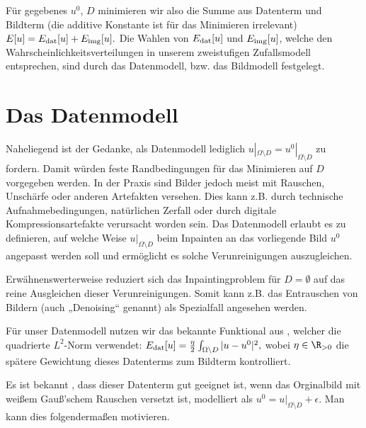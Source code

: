 \documentclass{mythesis}
\begin{document}
Für gegebenes $u^0$, $D$ minimieren wir also die Summe aus Datenterm und Bildterm (die additive Konstante ist für das Minimieren irrelevant)
\begin{math}
    E[u] = E_{\mathrm{dat}}[u] + E_{\mathrm{img}}[u].
\end{math}
Die Wahlen von $E_{\mathrm{dat}}[u]$ und $E_{\mathrm{img}}[u]$, welche den Wahrscheinlichkeitsverteilungen in unserem zweistufigen Zufallsmodell entsprechen, sind durch das Datenmodell, bzw. das Bildmodell festgelegt.


\section{Das Datenmodell}

Naheliegend ist der Gedanke, als Datenmodell lediglich $u|_{\Omega \setminus D} = u^0|_{\Omega \setminus D}$ zu fordern.
Damit würden feste Randbedingungen für das Minimieren auf $D$ vorgegeben werden.
In der Praxis sind Bilder jedoch meist mit Rauschen, Unschärfe oder anderen Artefakten versehen.
Dies kann z.B. durch technische Aufnahmebedingungen, natürlichen Zerfall oder durch digitale Kompressionsartefakte verursacht worden sein.
Das Datenmodell erlaubt es zu definieren, auf welche Weise $u|_{\Omega \setminus D}$ beim Inpainten an das vorliegende Bild $u^0$ angepasst werden soll und ermöglicht es solche Verunreinigungen auszugleichen.

Erwähnenswerterweise reduziert sich das Inpaintingproblem für $D = \emptyset$ auf das reine Ausgleichen dieser Verunreinigungen.
Somit kann z.B. das Entrauschen von Bildern (auch „Denoising“ genannt) als Spezialfall angesehen werden.

Für unser Datenmodell nutzen wir das bekannte Funktional aus \cite{rudin1992nonlinear}, welcher die quadrierte $L^2$-Norm verwendet:
\begin{math}
    E_{\mathrm{dat}}[u] = \frac{\eta}{2} \int_{\Omega \setminus D} |u - u^0|^2,
\end{math}
wobei $\eta \in \R_{> 0}$ die spätere Gewichtung dieses Datenterms zum Bildterm kontrolliert.

Es ist bekannt \cite[§4.5]{chan2005image}, dass dieser Datenterm gut geeignet ist, wenn das Orginalbild mit weißem Gauß'schem Rauschen versetzt ist, modelliert als $u^0 = u|_{\Omega \setminus D} + \epsilon$.
Man kann dies folgendermaßen motivieren.
\end{document}

